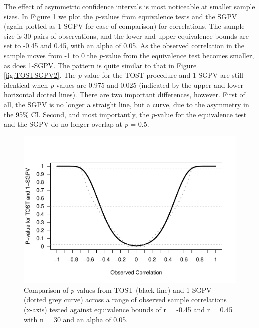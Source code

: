 \documentclass[floatsintext,man]{apa6}
\theoremstyle{definition}
\theoremstyle{definition}
\theoremstyle{definition}
\theoremstyle{remark}
\begin{document}
The effect of asymmetric confidence intervals is most noticeable at
smaller sample sizes. In Figure \ref{fig:TOSTSGPV11} we plot the
\emph{p}-values from equivalence tests and the SGPV (again plotted as
1-SGPV for ease of comparison) for correlations. The sample size is 30
pairs of observations, and the lower and upper equivalence bounds are
set to -0.45 and 0.45, with an alpha of 0.05. As the observed
correlation in the sample moves from -1 to 0 the \emph{p}-value from the
equivalence test becomes smaller, as does 1-SGPV. The pattern is quite
similar to that in Figure \ref{fig:TOSTSGPV2}. The \emph{p}-value for
the TOST procedure and 1-SGPV are still identical when \emph{p}-values
are 0.975 and 0.025 (indicated by the upper and lower horizontal dotted
lines). There are two important differences, however. First of all, the
SGPV is no longer a straight line, but a curve, due to the asymmetry in
the 95\% CI. Second, and most importantly, the \emph{p}-value for the
equivalence test and the SGPV do no longer overlap at \emph{p} = 0.5.

\begin{figure}
\centering
\includegraphics{manuscript_files/figure-latex/TOSTSGPV11-1.pdf}
\caption{\label{fig:TOSTSGPV11}Comparison of \emph{p}-values from TOST
(black line) and 1-SGPV (dotted grey curve) across a range of observed
sample correlations (x-axis) tested against equivalence bounds of r =
-0.45 and r = 0.45 with n = 30 and an alpha of 0.05.}
\end{figure}
\end{document}
